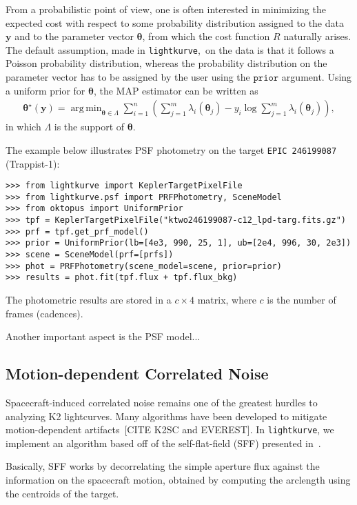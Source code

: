 \documentclass[twocolumn]{aastex62}
\newcommand{\lightkurve}{\texttt{lightkurve}}
\DeclareMathOperator*{\argmin}{arg\,min}
\begin{document}
From a probabilistic point of view, one is often interested in minimizing the
expected cost with respect to some probability distribution assigned to the data
$\bm{y}$ and to the parameter vector $\bm{\theta}$, from which the cost function
$R$ naturally arises. The default assumption, made in \lightkurve,~on the data is
that it follows a Poisson probability distribution, whereas the probability
distribution on the parameter vector has to be assigned by the user using the $\texttt{prior}$
argument. Using a uniform prior for $\bm{\theta}$, the MAP estimator can be written
as
\begin{align}
    \bm{\theta}^{\star}(\bm{y}) = \argmin_{\bm{\theta} \in \Lambda} \sum_{i=1}^{n}
    \left(\sum_{j=1}^{m}\lambda_i(\bm{\theta}_j) - y_i\log\sum_{j=1}^{m}\lambda_i(\bm{\theta}_j)\right),
\end{align}
in which $\Lambda$ is the support of $\bm{\theta}$.

The example below illustrates PSF photometry on the target \texttt{EPIC 246199087}
(Trappist-1):

\begin{verbatim}
>>> from lightkurve import KeplerTargetPixelFile
>>> from lightkurve.psf import PRFPhotometry, SceneModel
>>> from oktopus import UniformPrior
>>> tpf = KeplerTargetPixelFile("ktwo246199087-c12_lpd-targ.fits.gz")
>>> prf = tpf.get_prf_model()
>>> prior = UniformPrior(lb=[4e3, 990, 25, 1], ub=[2e4, 996, 30, 2e3])
>>> scene = SceneModel(prf=[prfs])
>>> phot = PRFPhotometry(scene_model=scene, prior=prior)
>>> results = phot.fit(tpf.flux + tpf.flux_bkg)
\end{verbatim}

The photometric results are stored in a $c \times 4$ matrix, where $c$ is the
number of frames (cadences).

Another important aspect is the PSF model...

\subsection{Motion-dependent Correlated Noise}
\label{subsection:motion}

Spacecraft-induced correlated noise remains one of the greatest hurdles to
analyzing K2 lightcurves. Many algorithms have been developed to mitigate
motion-dependent artifacts~\cite{vanderburg14}[CITE K2SC and EVEREST].
In \lightkurve, we implement an algorithm based off of the self-flat-field
(SFF) presented in~\cite{vanderburg14}.

Basically, SFF works by decorrelating the simple aperture flux
against the information on the spacecraft motion, obtained by computing the
arclength using the centroids of the target.
\end{document}
